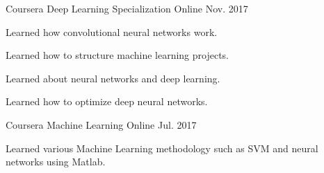 

\begin{cventries}

  \cventry
  {Coursera} %
  {Deep Learning Specialization} %
  {Online} %
  {Nov. 2017} %
  {
    \begin{cvitems} %
      \item {Learned how convolutional neural networks work.}
      \item {Learned how to structure machine learning projects.}
      \item {Learned about neural networks and deep learning. }
      \item {Learned how to optimize deep neural networks.}
    \end{cvitems}
  }

  \cventry
  {Coursera} %
  {Machine Learning} %
  {Online} %
  {Jul. 2017} %
  {
    \begin{cvitems} %
      \item {Learned various Machine Learning methodology such as SVM and neural networks using Matlab.}
    \end{cvitems}
  }

\end{cventries}
